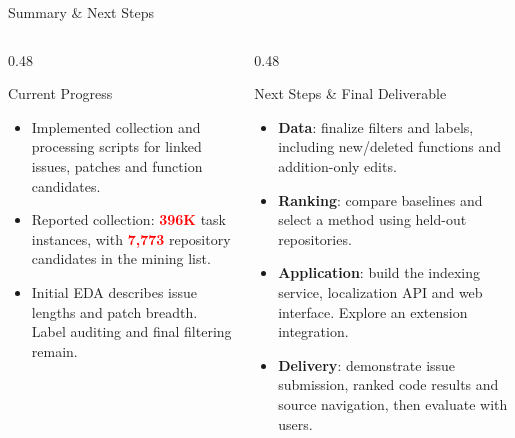 \documentclass[t, aspectratio=169]{beamer}
\newcommand{\stat}[1]{\textcolor{red}{\textbf{#1}}}
\begin{document}
\begin{frame}{Summary \& Next Steps}
\small
\begin{columns}[T]
\begin{column}{0.48\textwidth}
\begin{block}{Current Progress}
\begin{itemize}
    \setlength{\itemsep}{5pt}
    \item Implemented collection and processing scripts for linked issues, patches and function candidates.
    \item Reported collection: \stat{396K} task instances, with \stat{7,773} repository candidates in the mining list.
    \item Initial EDA describes issue lengths and patch breadth. Label auditing and final filtering remain.
\end{itemize}
\end{block}
\end{column}
\begin{column}{0.48\textwidth}
\begin{block}{Next Steps \& Final Deliverable}
\begin{itemize}
    \setlength{\itemsep}{4pt}
    \item \textbf{Data}: finalize filters and labels, including new/deleted functions and addition-only edits.
    \item \textbf{Ranking}: compare baselines and select a method using held-out repositories.
    \item \textbf{Application}: build the indexing service, localization API and web interface. Explore an extension integration.
    \item \textbf{Delivery}: demonstrate issue submission, ranked code results and source navigation, then evaluate with users.
\end{itemize}
\end{block}
\end{column}
\end{columns}
\end{frame}

\useStyleLogoOnly
\hustthankyou
\end{document}
